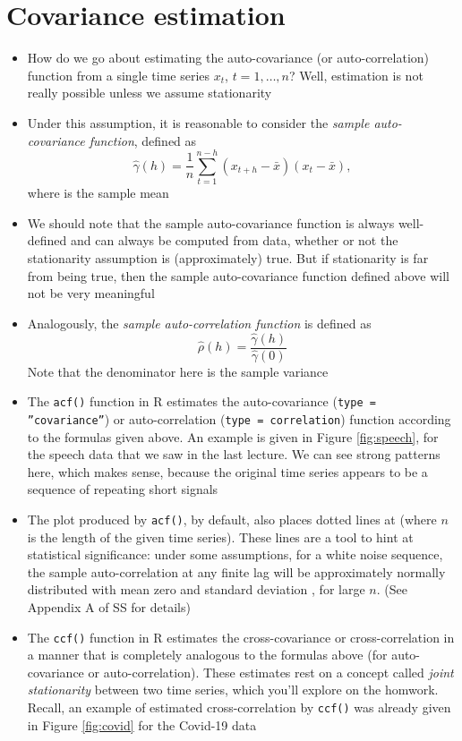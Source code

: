 \documentclass{article}
\begin{document}
\section{Covariance estimation}

\begin{itemize}
\item How do we go about estimating the auto-covariance (or auto-correlation)
  function from a single time series $x_t$, $t = 1,\dots,n$? Well, estimation is 
  not really possible unless we assume stationarity

\item Under this assumption, it is reasonable to consider the \emph{sample 
    auto-covariance function}, defined as 
  \[
  \hat\gamma(h) = \frac{1}{n} \sum_{t=1}^{n-h} (x_{t+h} - \bar{x})(x_t -
  \bar{x}),
  \]
  where  is the sample mean

\item We should note that the sample auto-covariance function is always
  well-defined and can always be computed from data, whether or not the
  stationarity assumption is (approximately) true. But if stationarity is far
  from being true, then the sample auto-covariance function defined above will
  not be very meaningful 

\item Analogously, the \emph{sample auto-correlation function} is defined as 
  \[
  \hat\rho(h) = \frac{\hat\gamma(h)}{\hat\gamma(0)}
  \]
  Note that the denominator here is the sample variance

\item The \texttt{acf()} function in R estimates the auto-covariance
  (\texttt{type = ''covariance''}) or auto-correlation (\texttt{type =
    correlation}) function according to the formulas given above. An example is
  given in Figure \ref{fig:speech}, for the speech data that we saw in the last 
  lecture. We can see strong patterns here, which makes sense, because the
  original time series appears to be a sequence of repeating short signals 

\item The plot produced by \texttt{acf()}, by default, also places dotted lines
  at  (where $n$ is the length of the given time
  series). These lines are a tool to hint at statistical significance: under
  some assumptions, for a white noise sequence, the sample auto-correlation at
  any finite lag will be approximately normally distributed with mean zero and
  standard deviation , for large $n$. (See Appendix A of SS
  for details)  

\item The \texttt{ccf()} function in R estimates the cross-covariance or
  cross-correlation in a manner that is completely analogous to the formulas
  above (for auto-covariance or auto-correlation). These estimates rest on a
  concept called \emph{joint stationarity} between two time series, which you'll
  explore on the homwork. Recall, an example of estimated cross-correlation by
  \texttt{ccf()} was already given in Figure \ref{fig:covid} for the Covid-19 data
\end{itemize}
\end{document}
